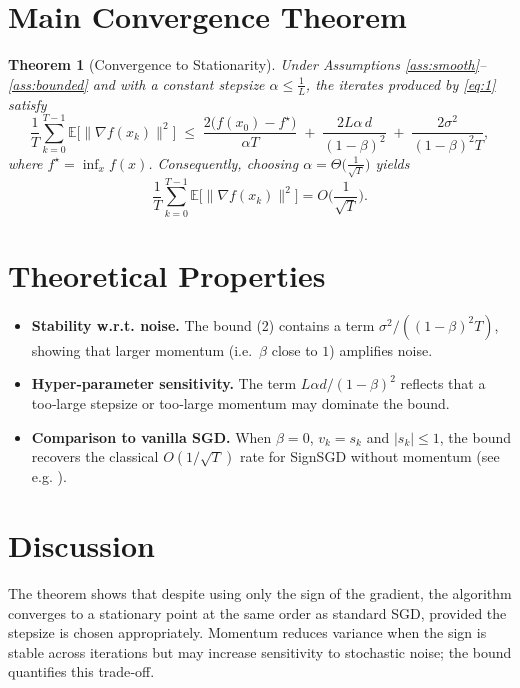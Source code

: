 \documentclass{article}
\newtheorem{theorem}{Theorem}
\newcommand{\E}{\mathbb{E}}
\begin{document}
\section*{Main Convergence Theorem}
\begin{theorem}[Convergence to Stationarity]\label{thm:main}
Under Assumptions \ref{ass:smooth}–\ref{ass:bounded} and with a constant stepsize $\alpha\le\frac{1}{L}$,
the iterates produced by \eqref{eq:1} satisfy
\[
\frac{1}{T}\sum_{k=0}^{T-1}\E\big[\|\nabla f(x_k)\|^{2}\big]
\;\le\;
\frac{2\big(f(x_0)-f^{\star}\big)}{\alpha T}
\;+\;
\frac{2L\alpha\,d}{(1-\beta)^{2}}
\;+\;
\frac{2\sigma^{2}}{(1-\beta)^{2}T},
\tag{2}
\]
where $f^{\star}=\inf_{x}f(x)$. Consequently, choosing $\alpha=\Theta\big(\tfrac{1}{\sqrt{T}}\big)$ yields
\[
\frac{1}{T}\sum_{k=0}^{T-1}\E\big[\|\nabla f(x_k)\|^{2}\big]
=O\!\Big(\frac{1}{\sqrt{T}}\Big).
\]
\end{theorem}

\section*{Theoretical Properties}
\begin{itemize}
    \item \textbf{Stability w.r.t. noise.} The bound (2) contains a term $\sigma^{2}/((1-\beta)^{2}T)$, showing that larger momentum (i.e.\ $\beta$ close to $1$) amplifies noise.
    \item \textbf{Hyper‑parameter sensitivity.} The term $L\alpha d/(1-\beta)^{2}$ reflects that a too‑large stepsize or too‑large momentum may dominate the bound.
    \item \textbf{Comparison to vanilla SGD.} When $\beta=0$, $v_k=s_k$ and $|s_k|\le1$, the bound recovers the classical $O(1/\sqrt{T})$ rate for SignSGD without momentum (see e.g. \cite{bernstein2018signsgd}).
\end{itemize}

\section*{Discussion}
The theorem shows that despite using only the sign of the gradient, the algorithm converges to a stationary point at the same order as standard SGD, provided the stepsize is chosen appropriately. Momentum reduces variance when the sign is stable across iterations but may increase sensitivity to stochastic noise; the bound quantifies this trade‑off.

\newpage
\end{document}
